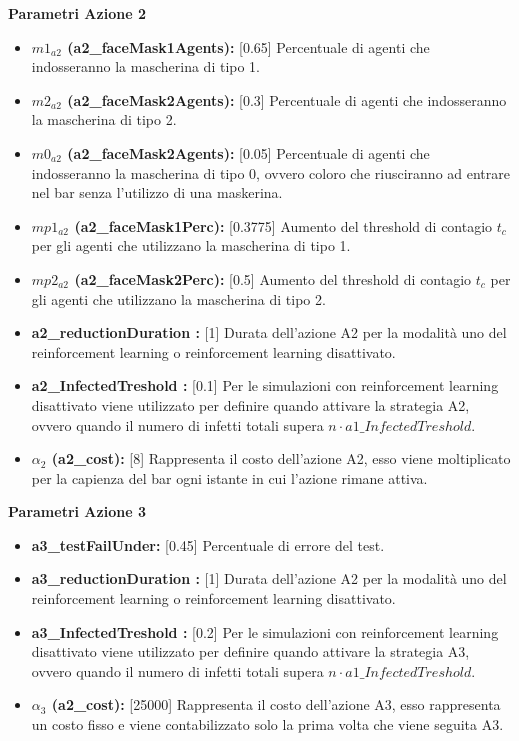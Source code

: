 \documentclass{article}
\begin{document}
{    \textbf{Parametri Azione 2}
    \begin{itemize}
        \item \textbf{$m1_{a2}$ (a2\_faceMask1Agents):} [0.65] Percentuale di agenti che indosseranno la mascherina di tipo 1.
        \item \textbf{$m2_{a2}$ (a2\_faceMask2Agents):} [0.3] Percentuale di agenti che indosseranno la mascherina di tipo 2.
        \item \textbf{$m0_{a2}$ (a2\_faceMask2Agents):} [0.05] Percentuale di agenti che indosseranno la mascherina di tipo 0, ovvero coloro che riusciranno ad entrare nel bar senza l'utilizzo di una maskerina.
        \item \textbf{$mp1_{a2}$ (a2\_faceMask1Perc):} [0.3775] Aumento del threshold di contagio $t_{c}$ per gli agenti che utilizzano la mascherina di tipo 1.
        \item \textbf{$mp2_{a2}$ (a2\_faceMask2Perc):} [0.5] Aumento del threshold di contagio $t_{c}$ per gli agenti che utilizzano la mascherina di tipo 2.
        \item \textbf{a2\_reductionDuration :} [1] Durata dell'azione A2 per la modalità uno del reinforcement learning o reinforcement learning disattivato.
        \item \textbf{a2\_InfectedTreshold :} [0.1] Per le simulazioni con reinforcement learning disattivato viene utilizzato per definire quando attivare la strategia A2, ovvero quando il numero di infetti totali supera $n \cdot a1\_InfectedTreshold$.
        \item \textbf{$\alpha_{2}$ (a2\_cost):} [8] Rappresenta il costo dell'azione A2, esso viene moltiplicato per la capienza del bar ogni istante in cui l'azione rimane attiva.\newline
    \end{itemize}

    \textbf{Parametri Azione 3}
    \begin{itemize}
        \item \textbf{a3\_testFailUnder:} [0.45] Percentuale di errore del test.
        \item \textbf{a3\_reductionDuration :} [1] Durata dell'azione A2 per la modalità uno del reinforcement learning o reinforcement learning disattivato.
        \item \textbf{a3\_InfectedTreshold :} [0.2] Per le simulazioni con reinforcement learning disattivato viene utilizzato per definire quando attivare la strategia A3, ovvero quando il numero di infetti totali supera $n \cdot a1\_InfectedTreshold$.
        \item \textbf{$\alpha_{3}$ (a2\_cost):} [25000] Rappresenta il costo dell'azione A3, esso rappresenta un costo fisso e viene contabilizzato solo la prima volta che viene seguita A3.\newline
    \end{itemize}

}
\end{document}
